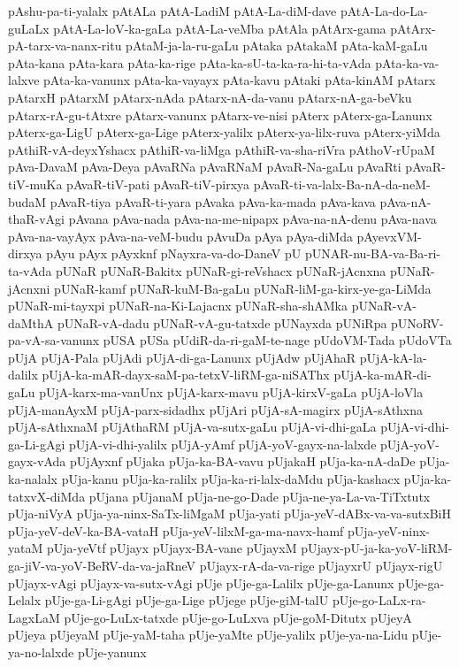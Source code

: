 {pAshu-pa-ti-yalalx
pAtALa
pAtA-LadiM
pAtA-La-diM-dave
pAtA-La-do-La-guLaLx
pAtA-La-loV-ka-gaLa
pAtA-La-veMba
pAtAla
pAtArx-gama
pAtArx-pA-tarx-va-nanx-ritu
pAtaM-ja-la-ru-gaLu
pAtaka
pAtakaM
pAta-kaM-gaLu
pAta-kana
pAta-kara
pAta-ka-rige
pAta-ka-sU-ta-ka-ra-hi-ta-vAda
pAta-ka-va-lalxve
pAta-ka-vanunx
pAta-ka-vayayx
pAta-kavu
pAtaki
pAta-kinAM
pAtarx
pAtarxH
pAtarxM
pAtarx-nAda
pAtarx-nA-da-vanu
pAtarx-nA-ga-beVku
pAtarx-rA-gu-tAtxre
pAtarx-vanunx
pAtarx-ve-nisi
pAterx
pAterx-ga-Lanunx
pAterx-ga-LigU
pAterx-ga-Lige
pAterx-yalilx
pAterx-ya-lilx-ruva
pAterx-yiMda
pAthiR-vA-deyxYshacx
pAthiR-va-liMga
pAthiR-va-sha-riVra
pAthoV-rUpaM
pAva-DavaM
pAva-Deya
pAvaRNa
pAvaRNaM
pAvaR-Na-gaLu
pAvaRti
pAvaR-tiV-muKa
pAvaR-tiV-pati
pAvaR-tiV-pirxya
pAvaR-ti-va-lalx-Ba-nA-da-neM-budaM
pAvaR-tiya
pAvaR-ti-yara
pAvaka
pAva-ka-mada
pAva-kava
pAva-nA-thaR-vAgi
pAvana
pAva-nada
pAva-na-me-nipapx
pAva-na-nA-denu
pAva-nava
pAva-na-vayAyx
pAva-na-veM-budu
pAvuDa
pAya
pAya-diMda
pAyevxVM-dirxya
pAyu
pAyx
pAyxknf
pNayxra-va-do-DaneV
pU
pUNAR-nu-BA-va-Ba-ri-ta-vAda
pUNaR
pUNaR-Bakitx
pUNaR-gi-reVshacx
pUNaR-jAcnxna
pUNaR-jAcnxni
pUNaR-kamf
pUNaR-kuM-Ba-gaLu
pUNaR-liM-ga-kirx-ye-ga-LiMda
pUNaR-mi-tayxpi
pUNaR-na-Ki-Lajacnx
pUNaR-sha-shAMka
pUNaR-vA-daMthA
pUNaR-vA-dadu
pUNaR-vA-gu-tatxde
pUNayxda
pUNiRpa
pUNoRV-pa-vA-sa-vanunx
pUSA
pUSa
pUdiR-da-ri-gaM-te-nage
pUdoVM-Tada
pUdoVTa
pUjA
pUjA-Pala
pUjAdi
pUjA-di-ga-Lanunx
pUjAdw
pUjAhaR
pUjA-kA-la-dalilx
pUjA-ka-mAR-dayx-saM-pa-tetxV-liRM-ga-niSAThx
pUjA-ka-mAR-di-gaLu
pUjA-karx-ma-vanUnx
pUjA-karx-mavu
pUjA-kirxV-gaLa
pUjA-loVla
pUjA-manAyxM
pUjA-parx-sidadhx
pUjAri
pUjA-sA-magirx
pUjA-sAthxna
pUjA-sAthxnaM
pUjAthaRM
pUjA-va-sutx-gaLu
pUjA-vi-dhi-gaLa
pUjA-vi-dhi-ga-Li-gAgi
pUjA-vi-dhi-yalilx
pUjA-yAmf
pUjA-yoV-gayx-na-lalxde
pUjA-yoV-gayx-vAda
pUjAyxnf
pUjaka
pUja-ka-BA-vavu
pUjakaH
pUja-ka-nA-daDe
pUja-ka-nalalx
pUja-kanu
pUja-ka-ralilx
pUja-ka-ri-lalx-daMdu
pUja-kashacx
pUja-ka-tatxvX-diMda
pUjana
pUjanaM
pUja-ne-go-Dade
pUja-ne-ya-La-va-TiTxtutx
pUja-niVyA
pUja-ya-ninx-SaTx-liMgaM
pUja-yati
pUja-yeV-dABx-va-va-sutxBiH
pUja-yeV-deV-ka-BA-vataH
pUja-yeV-lilxM-ga-ma-navx-hamf
pUja-yeV-ninx-yataM
pUja-yeVtf
pUjayx
pUjayx-BA-vane
pUjayxM
pUjayx-pU-ja-ka-yoV-liRM-ga-jiV-va-yoV-BeRV-da-va-jaRneV
pUjayx-rA-da-va-rige
pUjayxrU
pUjayx-rigU
pUjayx-vAgi
pUjayx-va-sutx-vAgi
pUje
pUje-ga-Lalilx
pUje-ga-Lanunx
pUje-ga-Lelalx
pUje-ga-Li-gAgi
pUje-ga-Lige
pUjege
pUje-giM-talU
pUje-go-LaLx-ra-LagxLaM
pUje-go-LuLx-tatxde
pUje-go-LuLxva
pUje-goM-Ditutx
pUjeyA
pUjeya
pUjeyaM
pUje-yaM-taha
pUje-yaMte
pUje-yalilx
pUje-ya-na-Lidu
pUje-ya-no-lalxde
pUje-yanunx
}
